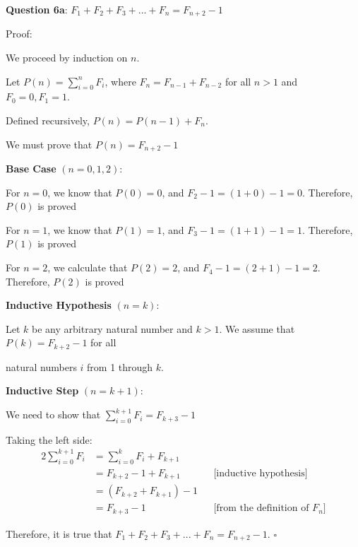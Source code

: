 \documentclass{article} %
\newcommand{\question}[2][]{\begin{flushleft}
        \textbf{Question #1}: #2

\end{flushleft}}
\begin{document}
    \question[6a]{$F_1 + F_2 + F_3 + ... + F_n = F_{n + 2} - 1$}

    Proof: 
    
    We proceed by induction on $n$.

    Let $P(n) = \sum_{i = 0}^{n} F_i$, where $F_n = F_{n - 1} + F_{n - 2}$ for all $n > 1$ and $F_0 = 0, F_1 = 1$.

    Defined recursively, $P(n) = P(n - 1) + F_n$.

    We must prove that $P(n) = F_{n + 2} - 1$

    \textbf{Base Case} $(n = 0, 1, 2)$:

    For $n = 0$, we know that $P(0) = 0$, and $F_2 - 1 = (1 + 0) - 1 = 0$. Therefore, $P(0)$ is proved

    For $n = 1$, we know that $P(1) = 1$, and $F_3 - 1 = (1 + 1) - 1 = 1$. Therefore, $P(1)$ is proved

    For $n = 2$, we calculate that $P(2) = 2$, and $F_4 - 1 = (2 + 1) - 1 = 2$. Therefore, $P(2)$ is proved

    \textbf{Inductive Hypothesis} $(n = k)$:

    Let $k$ be any arbitrary natural number and $k > 1$. We assume that $P(k) = F_{k+2} - 1$ for all
    
    natural numbers $i$ from 1 through $k$.

    \textbf{Inductive Step} $(n = k+1)$:

    We need to show that $\sum_{i = 0}^{k+1} F_i = F_{k + 3} - 1$

    Taking the left side:
    \begin{alignat*}{2}
        \sum_{i = 0}^{k+1} F_i &= \sum_{i = 0}^{k} F_i + F_{k + 1}\\
        &= F_{k + 2} - 1 + F_{k + 1}\ &&\text{[inductive hypothesis]}\\
        &= (F_{k + 2} + F_{k + 1}) - 1 \\
        &= F_{k + 3} - 1 &&\text{[from the definition of $F_n$]}
    \end{alignat*}
    
    Therefore, it is true that $F_1 + F_2 + F_3 + ... + F_n = F_{n + 2} - 1$. $\square$

    \newpage

                                                                           
\end{document}
